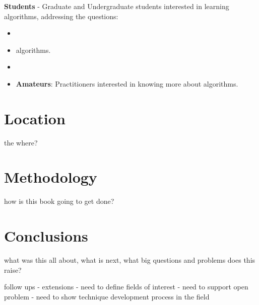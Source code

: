 \documentclass[a4paper, 11pt]{article}
\begin{document}
\textbf{Students} - Graduate and Undergraduate students interested in learning algorithms, addressing the questions:

\begin{itemize}
	\item  
	\item  algorithms.
	\item 
	\item \textbf{Amateurs}: Practitioners interested in knowing more about algorithms.
\end{itemize}


\section{Location}
the where?

\section{Methodology}
\label{sec:methodology}
how is this book going to get done?


\section{Conclusions}
\label{sec:conclusions}
what was this all about, what is next, what big questions and problems does this raise?


follow ups - extensions
- need to define fields of interest
- need to support open problem
- need to show technique development process in the field
\end{document}

